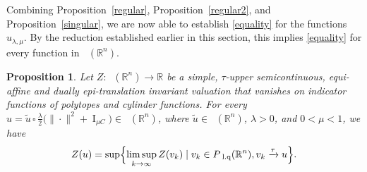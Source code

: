 \documentclass[11pt]{article}
\newtheorem{prop}[teo]{Proposition}
\theoremstyle{definition} %
\newcommand{\RR}{(\mathbb{R}^n)}
\DeclareMathOperator{\I}{I}
\DeclareMathOperator{\LQ}{_{l.q}}
\DeclareMathOperator{\LP}{Conv_{lp}}
\newcommand{\seq}{\xrightarrow{\tau}}
\begin{document}
Combining Proposition~\ref{regular}, Proposition~\ref{regular2}, and Proposition~\ref{singular}, we are now able to establish \eqref{equality} for the functions $u_{\lambda,\mu}$. By the reduction established earlier in this section, this implies \eqref{equality} for every function in $\LP\RR$.


\begin{prop}\label{prop10.3}
Let $Z:\LP\RR\rightarrow\mathbb{R}$ be a simple, $\tau$-upper semicontinuous, equi-affine and  dually epi-translation   invariant valuation that   vanishes on  indicator functions of polytopes and cylinder functions. For every $u = \tilde{u}\,\square\, \frac{\lambda}{2}\big(\|\cdot\|^2+\I_{\mu C}\big)\in \LP\RR$, where $\tilde{u}\in \LP(\mathbb{R}^n)$,  $ \lambda>0$, and $0<\mu<1$, we have 
   $$Z(u)=\sup\Bigl\{\limsup_{k\rightarrow\infty} Z(v_k)\mid v_k\in P\LQ\RR, v_k\seq u   \Bigr\}.$$ 
\end{prop}
\end{document}
